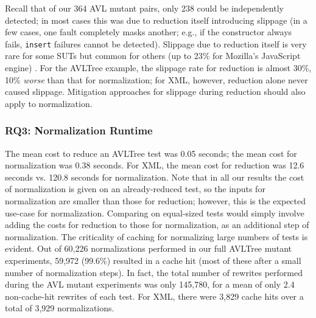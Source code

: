 Recall that of our 364 AVL mutant pairs, only 238 could be
independently detected; in most cases this was due to reduction itself
introducing slippage (in a few cases, one fault completely masks
another; e.g., if the constructor always fails, {\tt insert} failures
cannot be detected).  Slippage due to reduction itself is very rare for some SUTs but common
for others (up to 23\% for Mozilla's JavaScript engine)
\cite{PLDI13}.  For the AVLTree example, the slippage rate for
reduction is almost 30\%, 10\% \emph{worse} than that for
normalization; for XML, however, reduction alone never caused slippage.  Mitigation
approaches for slippage during reduction \cite{slippage} should also
apply to normalization.

\subsubsection{RQ3: Normalization Runtime}

The mean cost to reduce an AVLTree test was 0.05 seconds; the mean cost for normalization was 0.38
seconds.   For XML, the mean cost for reduction was 12.6 seconds vs.
120.8 seconds for normalization.  Note that in all our results the cost of normalization is given on an
already-reduced test, so the inputs for normalization are smaller than
those for reduction; however, this is the expected use-case for
normalization.  Comparing on equal-sized tests would simply involve
adding the costs for reduction to those for normalization, as an
additional step of normalization.  The criticality of caching
for normalizing large numbers of tests is evident.  Out of 60,226
normalizations performed in our full AVLTree mutant experiments,
59,972 (99.6\%) resulted in a cache hit (most of these after a small
number of normalization steps).  In fact, the total number of rewrites
performed during the AVL mutant experiments was only 145,780, for a mean of only
2.4 non-cache-hit rewrites of each test.  For XML, there were 3,829 cache hits over
a total of 3,929 normalizations.

